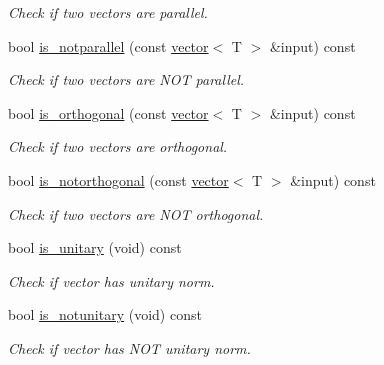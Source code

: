 \begin{DoxyCompactItemize}
\begin{DoxyCompactList}\small\item\em Check if two vectors are parallel. \end{DoxyCompactList}\item 
bool \hyperlink{classddd_1_1vector_a4d7791d777455365aed4a1476da78d67}{is\+\_\+notparallel} (const \hyperlink{classddd_1_1vector}{vector}$<$ T $>$ \&input) const
\begin{DoxyCompactList}\small\item\em Check if two vectors are N\+OT parallel. \end{DoxyCompactList}\item 
bool \hyperlink{classddd_1_1vector_aa4093c63121a3787e4b43581f23c3e0a}{is\+\_\+orthogonal} (const \hyperlink{classddd_1_1vector}{vector}$<$ T $>$ \&input) const
\begin{DoxyCompactList}\small\item\em Check if two vectors are orthogonal. \end{DoxyCompactList}\item 
bool \hyperlink{classddd_1_1vector_ab08843c258a0e50ff940ece9c03ad774}{is\+\_\+notorthogonal} (const \hyperlink{classddd_1_1vector}{vector}$<$ T $>$ \&input) const
\begin{DoxyCompactList}\small\item\em Check if two vectors are N\+OT orthogonal. \end{DoxyCompactList}\item 
\mbox{\label{classddd_1_1vector_a2fe8e8a3145f70a6f440cd636a13a7be}} 
bool \hyperlink{classddd_1_1vector_a2fe8e8a3145f70a6f440cd636a13a7be}{is\+\_\+unitary} (void) const
\begin{DoxyCompactList}\small\item\em Check if vector has unitary norm. \end{DoxyCompactList}\item 
\mbox{\label{classddd_1_1vector_a6a820bcc71691c4e3996eb0ce4cd60e6}} 
bool \hyperlink{classddd_1_1vector_a6a820bcc71691c4e3996eb0ce4cd60e6}{is\+\_\+notunitary} (void) const
\begin{DoxyCompactList}\small\item\em Check if vector has N\+OT unitary norm. \end{DoxyCompactList}\item 
\mbox{\label{classddd_1_1vector_a3ad5fe35a6b91b17a45af430a2622380}} 

\end{DoxyCompactItemize}
